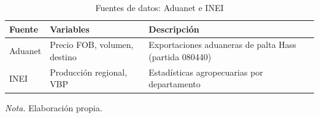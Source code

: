 \begin{table}[H]
\centering
\caption{Fuentes de datos: Aduanet e INEI}
\label{tab:fuentes_datos}
\small
\begin{tabularx}{\textwidth}{p{2cm}p{3cm}X}
\toprule
\textbf{Fuente} & \textbf{Variables} & \textbf{Descripci\'on} \\
\midrule
Aduanet & Precio FOB, volumen, destino & Exportaciones aduaneras de palta Hass (partida 080440) \\
INEI    & Producci\'on regional, VBP & Estad\'isticas agropecuarias por departamento \\
\bottomrule
\end{tabularx}
\parbox{0.94\textwidth}{\small \textit{Nota.} Elaboraci\'on propia.}
\end{table}
